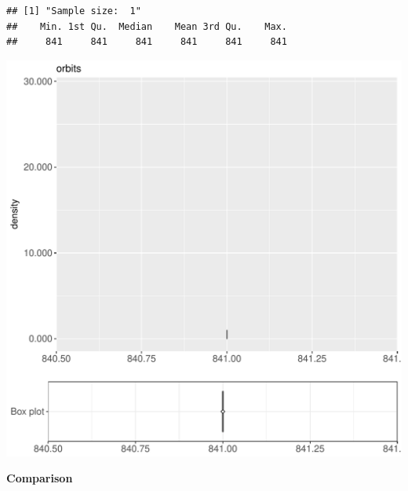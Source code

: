 \documentclass{article}\usepackage[]{graphicx}\usepackage[]{color}
\makeatletter
\def\maxwidth{ %
  \ifdim\Gin@nat@width>\linewidth
    \linewidth
  \else
    \Gin@nat@width
  \fi
}
\newenvironment{kframe}{%
 \def\at@end@of@kframe{}%
 \ifinner\ifhmode%
  \def\at@end@of@kframe{\end{minipage}}%
  \begin{minipage}{\columnwidth}%
 \fi\fi%
 \def\FrameCommand##1{\hskip\@totalleftmargin \hskip-\fboxsep
 \colorbox{shadecolor}{##1}\hskip-\fboxsep
     \hskip-\linewidth \hskip-\@totalleftmargin \hskip\columnwidth}%
 \MakeFramed {\advance\hsize-\width
   \@totalleftmargin\z@ \linewidth\hsize
   \@setminipage}}%
 {\par\unskip\endMakeFramed%
 \at@end@of@kframe}
\newenvironment{knitrout}{}{} %
\makeatother
\begin{document}
\begin{knitrout}
\color{fgcolor}\begin{kframe}
\begin{verbatim}
## [1] "Sample size:  1"
##    Min. 1st Qu.  Median    Mean 3rd Qu.    Max. 
##     841     841     841     841     841     841
\end{verbatim}


{\ttfamily\noindent\bfseries{}}\end{kframe}
\includegraphics[width=\maxwidth]{figure/RH8_cashewExceptRenameAlph_small-1} 

\end{knitrout}
  
 \textbf{Comparison}
  
\end{document}
